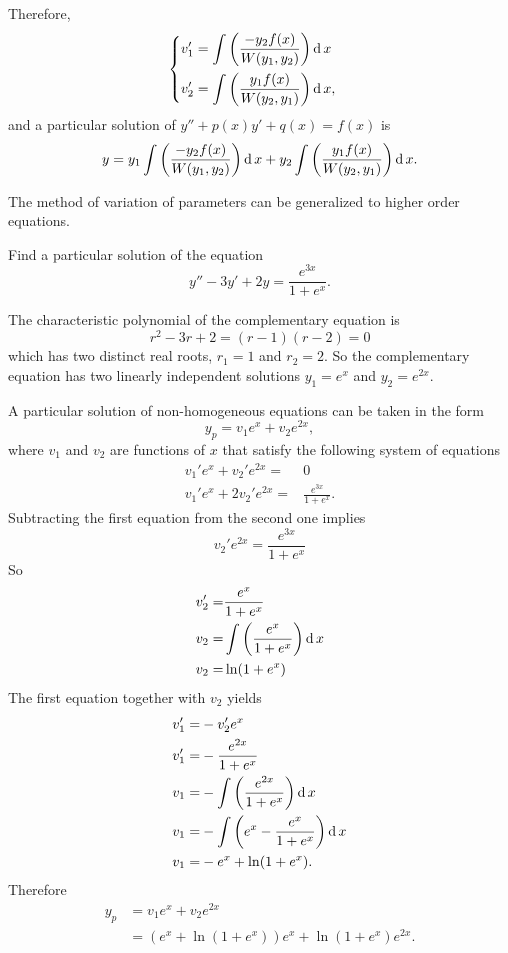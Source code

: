 Therefore, 
\[
\begin{cases}
  \displaystyle v_{1}'= \int \left(\frac{-y_{2} f(x)}{W(y_{1}, y_{2})}\right)\operatorname{d} x\\[1em]
  \displaystyle v_{2}'=\int \left(\frac{y_{1} f(x)}{W(y_{2}, y_{1})}\right)\operatorname{d} x,
\end{cases}  
\]
and a particular solution of $y''+p(x)y'+q(x)=f(x)$ is
\[
y=y_1 \int \left(\frac{-y_{2} f(x)}{W(y_{1}, y_{2})}\right)\operatorname{d} x + y_2 \int \left(\frac{y_{1} f(x)}{W(y_{2}, y_{1})}\right)\operatorname{d} x.
\]

The method of variation of parameters can be generalized to higher order equations.

\begin{example}
  Find a particular solution of the equation
\[y''-3y'+2y=\frac{e^{3x}}{1+e^x}.\]
\end{example}
\begin{solution}
  The characteristic polynomial of the complementary equation is
  \[r^2-3r+2=(r-1)(r-2)=0\]
  which has two distinct real roots, $r_1=1$ and $r_2=2$. So the complementary equation has two linearly independent solutions $y_1=e^{x}$ and \(y_2=e^{2x}\).
  
  A particular solution of non-homogeneous equations can be taken in the form
  \[y_p=v_1e^{x}+v_2e^{2x},\]
  where $v_1$ and $v_2$ are functions of $x$ that satisfy the following system of equations
  \[
    \begin{aligned} 
      v_1'e^{x}+v_2'e^{2x}=&0\\ v_1'e^{x}+2v_2'e^{2x}=&\frac{e^{3x}}{1+e^x}.
    \end{aligned}
  \]
  Subtracting the first equation from the second one implies 
  \[v_2'e^{2x}=\frac{e^{3x}}{1+e^x}\]
  So
  \[
    \begin{aligned}
      v_2'=&\frac{e^x}{1+e^x}\\
      v_2=&\int\left(\frac{e^x}{1+e^x}\right)\operatorname{d} x\\
      v_2=&\ln(1+e^x)\\
    \end{aligned}
    \]
  The first equation together with $v_2$ yields
  \[
    \begin{aligned}
      v_1'=&-v_2'e^{x}\\
      v_1'=&-\frac{e^{2x}}{1+e^x}\\
      v_1=&-\int\left(\frac{e^{2x}}{1+e^x}\right)\operatorname{d} x\\
      v_1=&-\int\left(e^x-\frac{e^x}{1+e^x}\right)\operatorname{d} x\\
      v_1=&-e^x+\ln(1+e^x).
    \end{aligned}
  \]
  Therefore
  \[
    \begin{aligned}
      y_p&=v_1e^{x}+v_2e^{2x}\\
      &=(e^x+\ln(1+e^x))e^{x}+\ln(1+e^x)e^{2x}.
    \end{aligned}
  \]
\end{solution}

